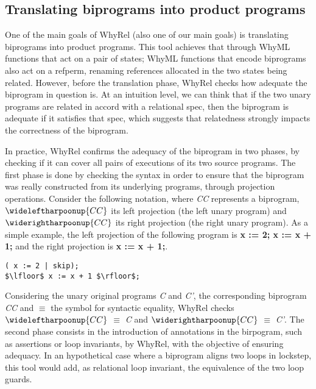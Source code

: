\FloatBarrier
\subsection{Translating biprograms into product programs}
\label{subsec:whyrel_translation}

One of the main goals of WhyRel (also one of our main goals) is translating biprograms into product programs.
This tool achieves that through WhyML functions that act on a pair of states; WhyML functions that encode biprograms also act on a refperm, renaming references allocated in the two states being related.
However, before the translation phase, WhyRel checks how adequate the biprogram in question is.
At an intuition level, we can think that if the two unary programs are related in accord with a relational spec, then the biprogram is adequate if it satisfies that spec, which suggests that relatedness strongly impacts the correctness of the biprogram.

In practice, WhyRel confirms the adequacy of the biprogram in two phases, by checking if it can cover all pairs of executions of its two source programs.
The first phase is done by checking the syntax in order to ensure that the biprogram was really constructed from its underlying programs, through projection operations.
Consider the following notation, where \emph{CC} represents a biprogram, $\wideleftharpoonup{CC}$ its left projection (the left unary program) and $\widerightharpoonup{CC}$ its right projection (the right unary program).
As a simple example, the left projection of the following program is \textbf{x := 2; x := x + 1;} and the right projection is \textbf{x := x + 1;}.

\begin{lstlisting}[style=while_lang, mathescape,
                      emph={skip},
                      emphstyle=\ttfamily\bfseries\color{myorange}]
( x := 2 | skip);
$\lfloor$ x := x + 1 $\rfloor$;
\end{lstlisting}

Considering the unary original programs \emph{C} and \emph{C'}, the corresponding biprogram \emph{CC} and $\equiv$ the symbol for syntactic equality, WhyRel checks $\wideleftharpoonup{CC}$ $\equiv$ \emph{C} and $\widerightharpoonup{CC}$ $\equiv$ \emph{C'}.
The second phase consists in the introduction of annotations in the birpogram, such as assertions or loop invariants, by WhyRel, with the objective of ensuring adequacy.
In an hypothetical case where a biprogram aligns two loops in lockstep, this tool would add, as relational loop invariant, the equivalence of the two loop guards.

